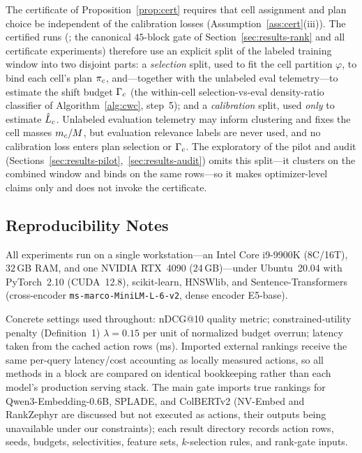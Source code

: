 The certificate of Proposition~\ref{prop:cert} requires that cell assignment and plan choice be independent of the calibration losses (Assumption~\ref{ass:cert}(iii)). The certified runs (\CWC{}; the canonical $45$-block gate of Section~\ref{sec:results-rank} and all certificate experiments) therefore use an explicit split of the labeled training window into two disjoint parts: a \emph{selection} split, used to fit the cell partition $\varphi$, to bind each cell's plan $\pi_c$, and---together with the unlabeled eval telemetry---to estimate the shift budget $\Gamma_c$ (the within-cell selection-vs-eval density-ratio classifier of Algorithm~\ref{alg:cwc}, step~5); and a \emph{calibration} split, used \emph{only} to estimate $\hat L_c$. Unlabeled evaluation telemetry may inform clustering and fixes the cell masses $m_c/M$, but evaluation relevance labels are never used, and no calibration loss enters plan selection or $\Gamma_c$. The exploratory \WCR{} of the pilot and audit (Sections~\ref{sec:results-pilot},~\ref{sec:results-audit}) omits this split---it clusters on the combined window and binds on the same rows---so it makes optimizer-level claims only and does not invoke the certificate.

\subsection{Reproducibility Notes}

 All experiments run on a single workstation---an Intel Core i9-9900K (8C/16T), $32$\,GB RAM, and one NVIDIA RTX~4090 (24\,GB)---under Ubuntu~20.04 with PyTorch~2.10 (CUDA~12.8), scikit-learn, HNSWlib, and Sentence-Transformers (cross-encoder \texttt{ms-marco-MiniLM-L-6-v2}, dense encoder E5-base).

Concrete settings used throughout: nDCG@10 quality metric; constrained-utility penalty (Definition~1) $\lambda=0.15$ per unit of normalized budget overrun; latency taken from the cached action rows (ms). Imported external rankings receive the same per-query latency/cost accounting as locally measured actions, so all methods in a block are compared on identical bookkeeping rather than each model's production serving stack. The main gate imports true rankings for Qwen3-Embedding-0.6B, SPLADE, and ColBERTv2 (NV-Embed \cite{lee2024nvembed} and RankZephyr \cite{pradeep2023rankzephyr} are discussed but not executed as actions, their outputs being unavailable under our constraints); each result directory records action rows, seeds, budgets, selectivities, feature sets, $k$-selection rules, and rank-gate inputs.
